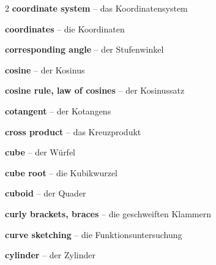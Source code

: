 \begin{multicols}{2}
\textbf{coordinate system} -- das Koordinatensystem\dotfill\hyperref[e:113]{\pageref*{e:113}}\par
\textbf{coordinates} -- die Koordinaten\dotfill\hyperref[e:116]{\pageref*{e:116}}\par
\textbf{corresponding angle} -- der Stufenwinkel\dotfill\hyperref[e:167]{\pageref*{e:167}}\par
\textbf{cosine} -- der Kosinus\dotfill\hyperref[e:133]{\pageref*{e:133}}\par
\textbf{cosine rule, law of cosines} -- der Kosinussatz\dotfill\hyperref[e:141]{\pageref*{e:141}}\par
\textbf{cotangent} -- der Kotangens\dotfill\hyperref[e:135]{\pageref*{e:135}}\par
\textbf{cross product} -- das Kreuzprodukt\dotfill\hyperref[e:307]{\pageref*{e:307}}\par
\textbf{cube} -- der Würfel\dotfill\hyperref[e:226]{\pageref*{e:226}}\par
\textbf{cube root} -- die Kubikwurzel\dotfill\hyperref[e:46]{\pageref*{e:46}}\par
\textbf{cuboid} -- der Quader\dotfill\hyperref[e:227]{\pageref*{e:227}}\par
\textbf{curly brackets, braces} -- die geschweiften Klammern\dotfill\hyperref[e:90]{\pageref*{e:90}}\par
\textbf{curve sketching} -- die Funktionsuntersuchung\dotfill\hyperref[e:280]{\pageref*{e:280}}\par
\textbf{cylinder} -- der Zylinder\dotfill\hyperref[e:229]{\pageref*{e:229}}\par


\end{multicols}
